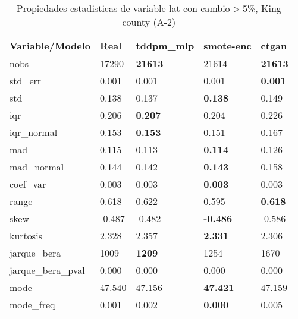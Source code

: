 \begin{table}[H]
\centering
\fontsize{8}{14}\selectfont
\caption{Propiedades estadisticas de variable lat con cambio\ensuremath{>}5\%, King county (A-2)}
\label{table-stats-king county-a-2-lat-short}
\begin{tabular}{|l|m{10em}|m{10em}|m{10em}|m{10em}|}
\hline
 \rowcolor[gray]{0.8}
Variable/Modelo & Real & tddpm\_mlp & smote-enc & ctgan \\
\hline nobs & 17290 & \bfseries 21613 & \cellcolor[rgb]{0.9, 0.54, 0.52} 21614 & \bfseries 21613 \\
\hline std\_err & 0.001 & \cellcolor[rgb]{0.9, 0.54, 0.52} 0.001 & 0.001 & \bfseries 0.001 \\
\hline std & 0.138 & 0.137 & \bfseries 0.138 & \cellcolor[rgb]{0.9, 0.54, 0.52} 0.149 \\
\hline iqr & 0.206 & \bfseries 0.207 & 0.204 & \cellcolor[rgb]{0.9, 0.54, 0.52} 0.226 \\
\hline iqr\_normal & 0.153 & \bfseries 0.153 & 0.151 & \cellcolor[rgb]{0.9, 0.54, 0.52} 0.167 \\
\hline mad & 0.115 & 0.113 & \bfseries 0.114 & \cellcolor[rgb]{0.9, 0.54, 0.52} 0.126 \\
\hline mad\_normal & 0.144 & 0.142 & \bfseries 0.143 & \cellcolor[rgb]{0.9, 0.54, 0.52} 0.158 \\
\hline coef\_var & 0.003 & 0.003 & \bfseries 0.003 & \cellcolor[rgb]{0.9, 0.54, 0.52} 0.003 \\
\hline range & 0.618 & 0.622 & \cellcolor[rgb]{0.9, 0.54, 0.52} 0.595 & \bfseries 0.618 \\
\hline skew & -0.487 & -0.482 & \bfseries -0.486 & \cellcolor[rgb]{0.9, 0.54, 0.52} -0.586 \\
\hline kurtosis & 2.328 & \cellcolor[rgb]{0.9, 0.54, 0.52} 2.357 & \bfseries 2.331 & 2.306 \\
\hline jarque\_bera & 1009 & \bfseries 1209 & 1254 & \cellcolor[rgb]{0.9, 0.54, 0.52} 1670 \\
\hline jarque\_bera\_pval & 0.000 & 0.000 & 0.000 & 0.000 \\
\hline mode & 47.540 & \cellcolor[rgb]{0.9, 0.54, 0.52} 47.156 & \bfseries 47.421 & 47.159 \\
\hline mode\_freq & 0.001 & 0.002 & \bfseries 0.000 & \cellcolor[rgb]{0.9, 0.54, 0.52} 0.005 \\
\hline
\end{tabular}
\end{table}
